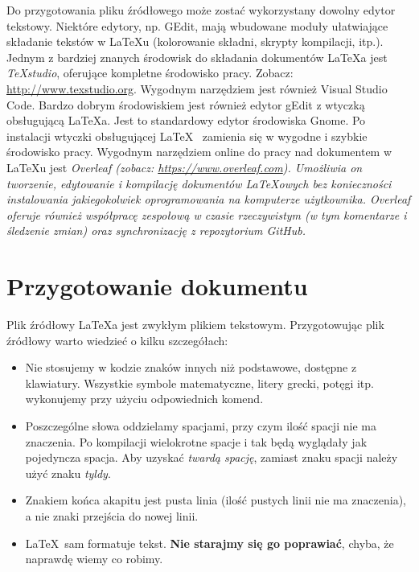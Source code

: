 Do przygotowania pliku źródłowego może zostać wykorzystany dowolny edytor tekstowy. Niektóre edytory, np. GEdit, mają wbudowane moduły ułatwiające składanie tekstów w \LaTeX u (kolorowanie składni, skrypty kompilacji, itp.).
Jednym z bardziej znanych środowisk do składania dokumentów  \LaTeX a jest {\em TeXstudio}, oferujące kompletne środowisko pracy. Zobacz: \url{http://www.texstudio.org}. Wygodnym narzędziem jest również Visual Studio Code.
Bardzo dobrym środowiskiem jest również edytor gEdit z wtyczką obsługującą \LaTeX a. Jest to standardowy edytor środowiska Gnome. Po instalacji wtyczki obsługującej \LaTeX~ zamienia się w wygodne i szybkie środowisko pracy.
Wygodnym narzędziem online do pracy nad dokumentem w \LaTeX u jest \em{Overleaf} (zobacz: \url{https://www.overleaf.com}). Umożliwia on tworzenie, edytowanie i kompilację dokumentów \LaTeX owych bez konieczności instalowania jakiegokolwiek oprogramowania na komputerze użytkownika. Overleaf oferuje również współpracę zespołową w czasie rzeczywistym (w tym komentarze i śledzenie zmian) oraz synchronizację z repozytorium GitHub.


\section{Przygotowanie dokumentu}
\label{sec:przygotowanieDokumentu}

Plik źródłowy \LaTeX a jest zwykłym plikiem tekstowym. Przygotowując plik
źródłowy warto wiedzieć o kilku szczegółach:

\begin{itemize}
\item
Nie stosujemy w kodzie znaków innych niż podstawowe, dostępne z klawiatury. Wszystkie symbole matematyczne, litery grecki, potęgi itp. wykonujemy przy użyciu odpowiednich komend.

\item
Poszczególne słowa oddzielamy spacjami, przy czym ilość spacji nie ma znaczenia.
Po kompilacji wielokrotne spacje i tak będą wyglądały jak pojedyncza spacja.
Aby uzyskać {\em twardą spację}, zamiast znaku spacji należy użyć znaku {\em
tyldy}.

\item
Znakiem końca akapitu jest pusta linia (ilość pustych linii nie ma znaczenia), a
nie znaki przejścia do nowej linii.

\item
\LaTeX~sam formatuje tekst. \textbf{Nie starajmy się go poprawiać}, chyba, że
naprawdę wiemy co robimy.
\end{itemize}
